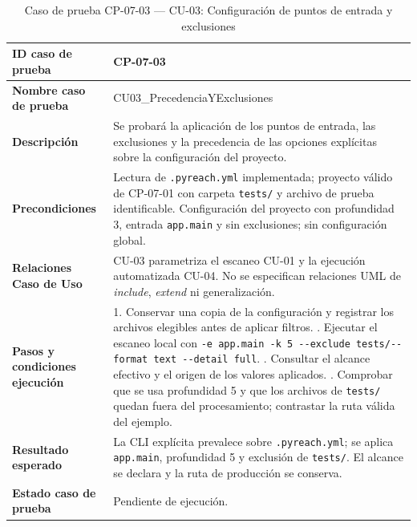 \clearpage
\begin{table}[H]
\centering\small{}
\renewcommand{\arraystretch}{1.15}
\caption{Caso de prueba CP-07-03 --- CU-03: Configuración de puntos de entrada y exclusiones}
\label{p7:tab:cp07_03}
\begin{tabularx}{\textwidth}{|P{4.15cm}|Y|}
\hline
\textbf{ID caso de prueba} & CP-07-03 \\ \hline
\textbf{Nombre caso de prueba} & CU03\_\allowbreak PrecedenciaYExclusiones \\ \hline
\textbf{Descripción} & Se probará la aplicación de los puntos de entrada, las exclusiones y la precedencia de las opciones explícitas sobre la configuración del proyecto. \\ \hline
\textbf{Precondiciones} & Lectura de \texttt{.\allowbreak pyreach.\allowbreak yml} implementada; proyecto válido de CP-07-01 con carpeta \texttt{tests/\allowbreak } y archivo de prueba identificable. Configuración del proyecto con profundidad 3, entrada \texttt{app.\allowbreak main} y sin exclusiones; sin configuración global. \\ \hline
\textbf{Relaciones Caso de Uso} & CU-03 parametriza el escaneo CU-01 y la ejecución automatizada CU-04. No se especifican relaciones UML de \textit{include}, \textit{extend} ni generalización. \\ \hline
\textbf{Pasos y condiciones ejecución} & 1. Conservar una copia de la configuración y registrar los archivos elegibles antes de aplicar filtros. . Ejecutar el escaneo local con \texttt{-\allowbreak e app.\allowbreak main -\allowbreak k 5 -\allowbreak -\allowbreak exclude tests/\allowbreak  -\allowbreak -\allowbreak format text -\allowbreak -\allowbreak detail full}. . Consultar el alcance efectivo y el origen de los valores aplicados. . Comprobar que se usa profundidad 5 y que los archivos de \texttt{tests/\allowbreak } quedan fuera del procesamiento; contrastar la ruta válida del ejemplo. \\ \hline
\textbf{Resultado esperado} & La CLI explícita prevalece sobre \texttt{.\allowbreak pyreach.\allowbreak yml}; se aplica \texttt{app.\allowbreak main}, profundidad 5 y exclusión de \texttt{tests/\allowbreak }. El alcance se declara y la ruta de producción se conserva. \\ \hline
\textbf{Estado caso de prueba} & Pendiente de ejecución. \\ \hline

\end{tabularx}
\end{table}
